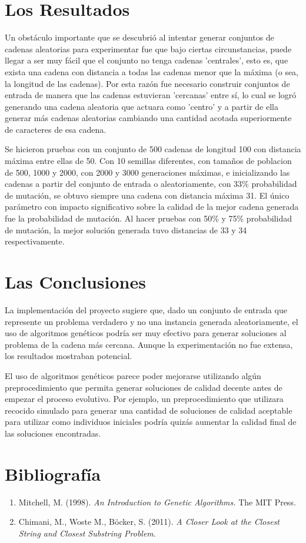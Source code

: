 \documentclass{article}
\begin{document}
\section{Los Resultados}
  Un obstáculo importante que se descubrió al intentar generar conjuntos de cadenas aleatorias para experimentar fue que
  bajo ciertas circunstancias, puede llegar a ser muy fácil que el conjunto no tenga cadenas 'centrales', esto es, que 
  exista una cadena con distancia a todas las cadenas menor que la máxima (o sea, la longitud de las cadenas).
  Por esta razón fue necesario construir conjuntos de entrada de manera que las cadenas estuvieran 'cercanas' entre sí,
  lo cual se logró generando una cadena aleatoria que actuara como 'centro' y a partir de ella generar más cadenas
  aleatorias cambiando una cantidad acotada superiormente de caracteres de esa cadena.

  Se hicieron pruebas con un conjunto de 500 cadenas de longitud 100 con distancia máxima entre ellas de 50.
  Con 10 semillas diferentes, con tamaños de poblacion de 500, 1000 y 2000, con 2000 y 3000 generaciones máximas,
  e inicializando las cadenas a partir del conjunto de entrada o aleatoriamente, con 33\% probabilidad de
  mutación, se obtuvo siempre una cadena con distancia máxima 31. El único parámetro con impacto
  significativo sobre la calidad de la mejor cadena generada fue la probabilidad de mutación. Al hacer pruebas
  con 50\% y 75\% probabilidad de mutación, la mejor solución generada tuvo distancias de 33 y 34 respectivamente.

\section{Las Conclusiones}
  La implementación del proyecto sugiere que, dado un conjunto de entrada que represente un problema verdadero
  y no una instancia generada aleatoriamente, el uso de algoritmos genéticos podría ser muy efectivo para generar soluciones
  al problema de la cadena más cercana. Aunque la experimentación no fue extensa, los resultados mostraban potencial.

  El uso de algoritmos genéticos parece poder mejorarse utilizando algún preprocedimiento que permita generar 
  soluciones de calidad decente antes de empezar el proceso evolutivo. Por ejemplo, un preprocedimiento que utilizara
  recocido simulado para generar una cantidad de soluciones de calidad aceptable para utilizar como individuos iniciales
  podría quizás aumentar la calidad final de las soluciones encontradas.

\section{Bibliografía}
  \begin{enumerate}
    \item Mitchell, M. (1998). \textit{An Introduction to Genetic Algorithms.} The MIT Press.
    \item Chimani, M., Woste M., Böcker, S. (2011). \textit{A Closer Look at the Closest String and Closest Substring Problem}. 
  \end{enumerate}
\end{document}
